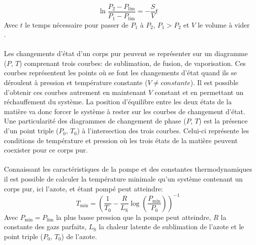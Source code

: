 \begin{equation}
    \ln\frac{P_\textrm{2} - P_\textrm{lim}}{P_\textrm{1} - P_\textrm{lim}} = -\frac{S}{V}t
    \label{eq:cinetique}
\end{equation}
Avec \(t\) le temps nécessaire pour passer de \(P_\textrm{1}\) à \(P_\textrm{2}\), \(P_\textrm{1} > P_\textrm{2}\) et \(V\) le volume à vider \cite{notice}. \\
\\
Les changements d'état d'un corps pur peuvent se représenter sur un diagramme (\(P\), \(T\)) comprenant trois courbes: de sublimation, de fusion, de vaporisation. Ces courbes représentent les points où se font les changements d'état quand ils se déroulent à pression et température constante (\(V \neq constante\)). Il est possible d'obtenir ces courbes autrement en maintenant \(V\) constant et en permettant un réchauffement du système. La position d'équilibre entre les deux états de la matière va donc forcer le système à rester sur les courbes de changement d'état. \\
Une particularité des diagrammes de changement de phase (\(P\), \(T\)) est la présence d'un point triple (\(P_\textrm{0}\), \(T_\textrm{0}\)) à l'intersection des trois courbes. Celui-ci représente les conditions de température et pression où les trois états de la matière peuvent coexister pour ce corps pur.\\
\\
Connaissant les caractéristiques de la pompe et des constantes thermodynamiques il est possible de calculer la température minimale qu'un système contenant un corps pur, ici l'azote, et étant pompé peut atteindre:
\begin{equation}
    T_\textrm{min} = (\frac{1}{T_\textrm{0}} - \frac{R}{L_\textrm{S}}\log(\frac{P_\textrm{min}}{P_\textrm{0}}))^{-1}
    \label{eq:Tmin}
\end{equation}
Avec \(P_\textrm{min} = P_\textrm{lim}\) la plus basse pression que la pompe peut atteindre, \(R\) la constante des gazs parfaits, \(L_\textrm{S}\) la chaleur latente de sublimation de l'azote et le point triple (\(P_\textrm{0}\), \(T_\textrm{0}\)) de l'azote. 
